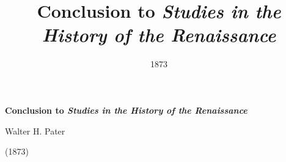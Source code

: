 \title{Conclusion to \emph{Studies in the History of the Renaissance}}
\author{}
\date{1873}


\renewcommand{\chaptername}{Pater, Conclusion to \emph{Studies in the History of the Renaissance}}

\thispagestyle{plain}


\begin{raggedright}
{\Large \linespread{1.0} \noindent \textbf{Conclusion to \emph{Studies in the History of the Renaissance}} \par} 

{\large Walter H. Pater \par} 

\vspace{0.5em}
\end{raggedright}

\begin{raggedleft}
{\large \linespread{1.2} (1873) \par}
\end{raggedleft}
\vspace{1em}



